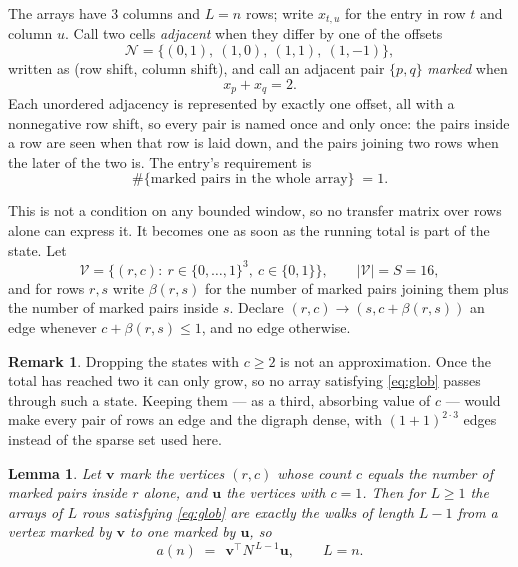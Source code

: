 \documentclass[11pt,a4paper]{article}
\theoremstyle{plain}
\newtheorem{lemma}[theorem]{Lemma}
\theoremstyle{definition}
\newtheorem{remark}[theorem]{Remark}
\begin{document}
The arrays have $3$ columns and $L=n$ rows; write $x_{t,u}$ for the entry in
row $t$ and column $u$. Call two cells \emph{adjacent} when they differ by one of the
offsets
\[
\mathcal N=\{(0,1),\ (1,0),\ (1,1),\ (1,-1)\},
\]
written as (row shift, column shift), and call an adjacent pair $\{p,q\}$
\emph{marked} when
\[
x_{p}+x_{q}=2 .
\]
Each unordered adjacency is represented by exactly one offset, all with a nonnegative row
shift, so every pair is named once and only once: the pairs inside a row are seen when
that row is laid down, and the pairs joining two rows when the later of the two is. The
entry's requirement is
\begin{equation}\label{eq:glob}
\#\{\text{marked pairs in the whole array}\}\;=1.
\end{equation}

This is not a condition on any bounded window, so no transfer matrix over rows alone can
express it. It becomes one as soon as the running total is part of the state. Let
\[
\mathcal V=\bigl\{(r,c):\ r\in\{0,\dots,1\}^{3},\ c\in\{0,1\}\bigr\},
\qquad |\mathcal V|=S=16,
\]
and for rows $r,s$ write $\beta(r,s)$ for the number of marked pairs joining them plus the
number of marked pairs inside $s$. Declare $(r,c)\to(s,c+\beta(r,s))$ an edge whenever
$c+\beta(r,s)\le1$, and no edge otherwise.

\begin{remark}
Dropping the states with $c\ge2$ is not an approximation. Once the total has reached two it
can only grow, so no array satisfying \eqref{eq:glob} passes through such a state. Keeping
them --- as a third, absorbing value of $c$ --- would make every pair of rows an edge and
the digraph dense, with $(1+1)^{2\cdot3}$ edges instead of the sparse set used here.
\end{remark}

\begin{lemma}\label{lem:walk}
Let $\mathbf{v}$ mark the vertices $(r,c)$ whose count $c$ equals the number of marked pairs
inside $r$ alone, and $\mathbf{u}$ the vertices with $c=1$. Then for $L\ge1$ the arrays
of $L$ rows satisfying \eqref{eq:glob} are exactly the walks of length $L-1$ from a
vertex marked by $\mathbf{v}$ to one marked by $\mathbf{u}$, so
\[
a(n)\;=\;\,\mathbf{v}^{\!\top}N^{\,L-1}\mathbf{u},\qquad L=n .
\]
\end{lemma}
\end{document}
